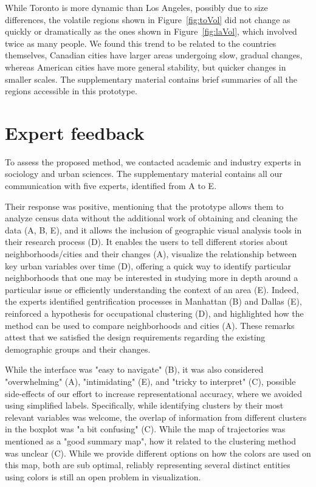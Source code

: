 While Toronto is more dynamic than Los Angeles, possibly due to size
differences, the volatile regions shown in Figure~\ref{fig:toVol} did not change
as quickly or dramatically as the ones shown in Figure~\ref{fig:laVol}, which
involved twice as many people. We found this trend to be related to the
countries themselves, Canadian cities have larger areas undergoing slow, gradual
changes, whereas American cities have more general stability, but quicker
changes in smaller scales. The supplementary material contains brief summaries
of all the regions accessible in this prototype.




\section{Expert feedback}
To assess the proposed method, we contacted academic and industry experts in
sociology and urban sciences. The supplementary material contains all our
communication with five experts, identified from A to E. 

Their response was positive,  mentioning that the prototype allows them to
analyze census data without the additional work of obtaining and cleaning the
data (A, B, E), and it allows the inclusion of geographic visual analysis tools
in their research process (D). It enables the users to tell different stories
about neighborhoods/cities and their changes (A), visualize the relationship
between key urban variables over time (D), offering a quick way to identify
particular neighborhoods that one may be interested in studying more in depth
around a particular issue or efficiently understanding the context of an area
(E).  Indeed, the experts identified gentrification processes in Manhattan (B)
and Dallas (E), reinforced a hypothesis for occupational clustering (D), and
highlighted how the method can be used to compare neighborhoods and cities (A).
These remarks attest that we satisfied the design requirements regarding the
existing demographic groups and their changes.



While the interface was "easy to navigate" (B), it was also considered
"overwhelming" (A), "intimidating" (E), and "tricky to interpret" (C), possible
side-effects of our effort to increase  representational accuracy, where we
avoided using simplified labels. Specifically, while identifying clusters by
their most relevant variables was welcome, the overlap of information from
different clusters in the boxplot was "a bit confusing" (C). While the map of
trajectories was mentioned as a "good summary map", how it related to the
clustering method was unclear (C). While we provide different options on how the
colors are used on this map, both are sub optimal, reliably representing several
distinct entities using colors is still an open problem in visualization.


